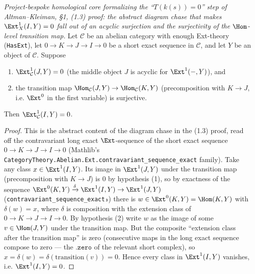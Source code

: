 \begin{lemma}

  \label{lem:ext1_vanishing_of_acyclic_chase}
  \textit{Project-bespoke homological core formalizing the ``$T(k(s)) = 0$'' step
  of Altman--Kleiman, §1, (1.3) proof: the abstract diagram chase that makes
  $\Ext^1_X(I, Y) = 0$ fall out of an acyclic surjection and the surjectivity of
  the $\Hom$-level transition map.}
  Let $\mathcal{C}$ be an abelian category with enough Ext-theory
  (\texttt{HasExt}), let $0 \to K \to J \to I \to 0$ be a short exact sequence in
  $\mathcal{C}$, and let $Y$ be an object of $\mathcal{C}$. Suppose
  \begin{enumerate}
    \item $\Ext^1_{\mathcal{C}}(J, Y) = 0$ (the middle object $J$ is acyclic for
      $\Ext^1(-, Y)$), and
    \item the transition map $\Hom_{\mathcal{C}}(J, Y) \to \Hom_{\mathcal{C}}(K, Y)$
      (precomposition with $K \to J$, i.e. $\Ext^0$ in the first variable) is
      surjective.
  \end{enumerate}
  Then $\Ext^1_{\mathcal{C}}(I, Y) = 0$.
  \begin{proof}
    This is the abstract content of the diagram chase in the (1.3) proof, read off
    the contravariant long exact $\Ext$-sequence of the short exact sequence
    $0 \to K \to J \to I \to 0$ (Mathlib's
    \texttt{CategoryTheory.Abelian.Ext.contravariant\_sequence\_exact} family).
    Take any class $x \in \Ext^1(I, Y)$. Its image in $\Ext^1(J, Y)$ under the
    transition map (precomposition with $K \to J$) is $0$ by hypothesis (1), so by
    exactness of the sequence
    $\Ext^0(K, Y) \xrightarrow{\delta} \Ext^1(I, Y) \to \Ext^1(J, Y)$
    (\texttt{contravariant\_sequence\_exact₃}) there is
    $w \in \Ext^0(K, Y) = \Hom(K, Y)$ with $\delta(w) = x$, where $\delta$ is
    composition with the extension class of $0 \to K \to J \to I \to 0$. By
    hypothesis (2) write $w$ as the image of some $v \in \Hom(J, Y)$ under the
    transition map. But the composite ``extension class after the transition map''
    is zero (consecutive maps in the long exact sequence compose to zero — the
    $\texttt{.zero}$ of the relevant short complex), so
    $x = \delta(w) = \delta(\text{transition}(v)) = 0$. Hence every class in
    $\Ext^1(I, Y)$ vanishes, i.e. $\Ext^1(I, Y) = 0$.


\end{proof}
\end{lemma}
